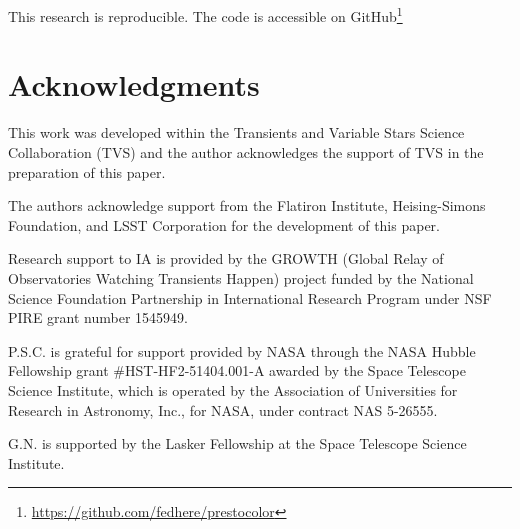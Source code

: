 \documentclass[letterpaper,longauthor,trackchanges,twocolumn,onecolappendix,sort&compress]{aastex62}
\begin{document}
This research is reproducible. The code is accessible on GitHub\footnote{\url{https://github.com/fedhere/prestocolor}}


\section{Acknowledgments}
This work was developed within the Transients and Variable Stars Science Collaboration (TVS) and the author acknowledges the support of TVS in the preparation of this paper. 

\noindent
The authors acknowledge support from the Flatiron Institute,  Heising-Simons Foundation, and LSST Corporation for the development of this paper.

\noindent
Research support to IA is provided by the GROWTH (Global Relay of Observatories Watching Transients Happen) project funded by the National Science Foundation Partnership in International Research Program under NSF PIRE grant number 1545949.

\noindent 
P.S.C. is grateful for support provided by NASA through the NASA Hubble Fellowship grant \#HST-HF2-51404.001-A awarded by the Space Telescope Science Institute, which is operated by the Association of Universities for Research in Astronomy, Inc., for NASA, under contract NAS 5-26555.

\noindent 
G.N. is supported by the Lasker Fellowship at the Space Telescope Science Institute.
\end{document}
